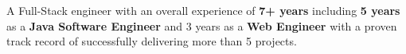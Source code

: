 \documentclass[10pt,a4paper,ragged2e,withhyper]{altacv}
\begin{document}
\begin{paracol}{2}









\switchcolumn

A Full-Stack engineer with an overall experience of \textbf{7+ years} including \textbf{5 years} as a \textbf{Java Software Engineer} and 3 years as a \textbf{Web Engineer} with a proven track record of successfully delivering more than 5 projects.\\~\\



\end{paracol}
\end{document}
